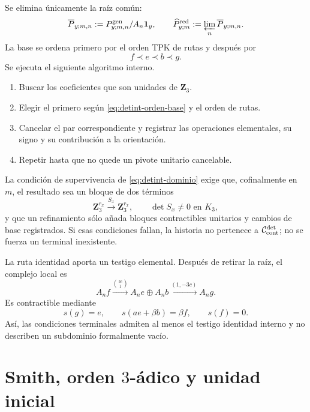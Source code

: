 Se elimina únicamente la raíz común:
\begin{equation}\label{eq:detint-p-reducido}
 \overline P_{y;m,n}
 :=P^{\rm gen}_{y;m,n}/A_n\mathbf1_y,
 \qquad
 \widehat P_{y;m}^{\rm red}:=\varprojlim_n\overline P_{y;m,n}.
\end{equation}
La base se ordena primero por el orden TPK de rutas y después por
\begin{equation}\label{eq:detint-orden-base}
 f\prec e\prec b\prec g.
\end{equation}
Se ejecuta el siguiente algoritmo interno.
\begin{enumerate}
 \item Buscar los coeficientes que son unidades de \(\mathbf Z_3\).
 \item Elegir el primero según \eqref{eq:detint-orden-base} y el orden de
 rutas.
 \item Cancelar el par correspondiente y registrar las operaciones
 elementales, su signo y su contribución a la orientación.
 \item Repetir hasta que no quede un pivote unitario cancelable.
\end{enumerate}
La condición de supervivencia de \eqref{eq:detint-dominio} exige que,
cofinalmente en \(m\), el resultado sea un bloque de dos términos
\begin{equation}\label{eq:detint-sx}
 \mathbf Z_3^{r_x}\xrightarrow{S_x}\mathbf Z_3^{r_x},
 \qquad
 \det S_x\ne0\text{ en }K_3,
\end{equation}
y que un refinamiento sólo añada bloques contractibles unitarios y cambios
de base registrados. Si esas condiciones fallan, la historia no pertenece a
\(\mathcal C_{\rm cont}^{\rm det}\); no se fuerza un terminal inexistente.

La ruta identidad aporta un testigo elemental. Después de retirar la raíz,
el complejo local es
\begin{equation}\label{eq:detint-testigo-contractil}
 A_nf\xrightarrow{\binom{3c}{1}}
 A_ne\oplus A_nb\xrightarrow{(1,-3c)}A_ng.
\end{equation}
Es contractible mediante
\begin{equation}\label{eq:detint-contraccion-local}
 s(g)=e,
 \qquad
 s(ae+\beta b)=\beta f,
 \qquad
 s(f)=0.
\end{equation}
Así, las condiciones terminales admiten al menos el testigo identidad
interno y no describen un subdominio formalmente vacío.

\section{Smith, orden \texorpdfstring{\(3\)}{3}-ádico y unidad inicial}

